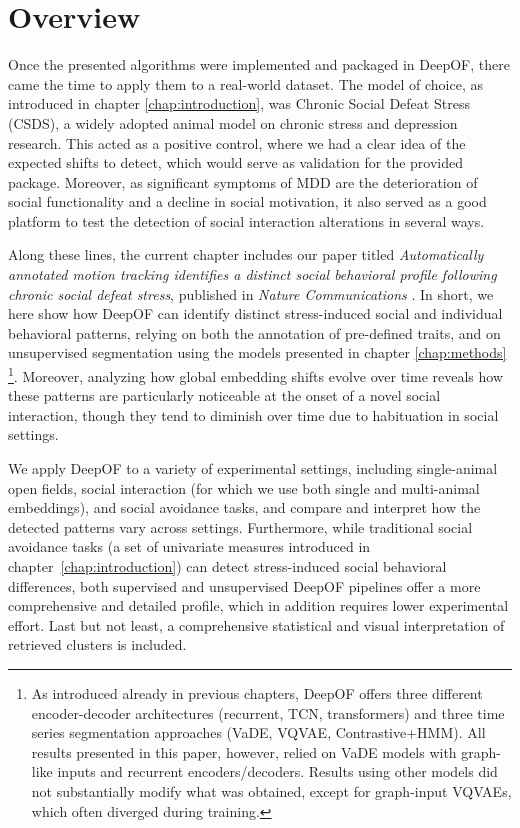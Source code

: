 \section{Overview}

Once the presented algorithms were implemented and packaged in DeepOF, there came the time to apply them to a real-world dataset. The model of choice, as introduced in chapter \ref{chap:introduction}, was Chronic Social Defeat Stress (CSDS), a widely adopted animal model on chronic stress and depression research. This acted as a positive control, where we had a clear idea of the expected shifts to detect, which would serve as validation for the provided package. Moreover, as significant symptoms of MDD are the deterioration of social functionality and a decline in social motivation, it also served as a good platform to test the detection of social interaction alterations in several ways.

Along these lines, the current chapter includes our paper titled \emph{Automatically annotated motion tracking identifies a distinct social behavioral profile following chronic social defeat stress}, published in \emph{Nature Communications} \cite{Bordes2023AutomaticallyStress}. In short, we here show how DeepOF can identify distinct stress-induced social and individual behavioral patterns, relying on both the annotation of pre-defined traits, and on unsupervised segmentation using the models presented in chapter \ref{chap:methods} \footnote{As introduced already in previous chapters, DeepOF offers three different encoder-decoder architectures (recurrent, TCN, transformers) and three time series segmentation approaches (VaDE, VQVAE, Contrastive+HMM). All results presented in this paper, however, relied on VaDE models with graph-like inputs and recurrent encoders/decoders. Results using other models did not substantially modify what was obtained, except for graph-input VQVAEs, which often diverged during training.}. Moreover, analyzing how global embedding shifts evolve over time reveals how these patterns are particularly noticeable at the onset of a novel social interaction, though they tend to diminish over time due to habituation in social settings.

We apply DeepOF to a variety of experimental settings, including single-animal open fields, social interaction (for which we use both single and multi-animal embeddings), and social avoidance tasks, and compare and interpret how the detected patterns vary across settings. Furthermore, while traditional social avoidance tasks (a set of univariate measures introduced in chapter~\ref{chap:introduction}) can detect stress-induced social behavioral differences, both supervised and unsupervised DeepOF pipelines offer a more comprehensive and detailed profile, which in addition requires lower experimental effort. Last but not least, a comprehensive statistical and visual interpretation of retrieved clusters is included.

